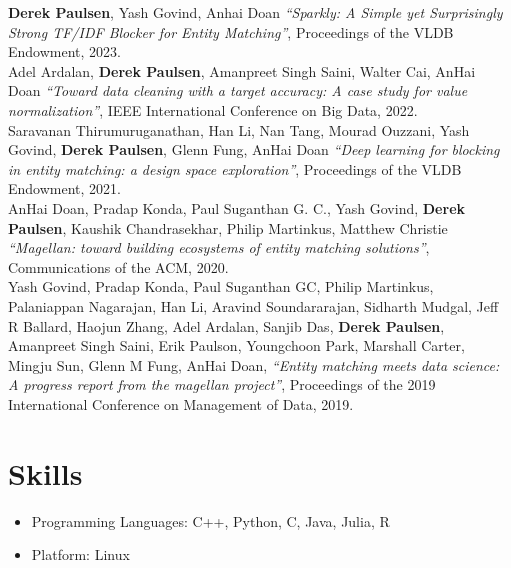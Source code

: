 \documentclass{resume}
\begin{document}
\textbf{Derek Paulsen}, Yash Govind, Anhai Doan
\textit{``Sparkly: A Simple yet Surprisingly Strong TF/IDF Blocker for Entity Matching''},
Proceedings of the VLDB Endowment, 2023.\\

Adel Ardalan, \textbf{Derek Paulsen}, Amanpreet Singh Saini, Walter Cai, AnHai Doan
\textit{``Toward data cleaning with a target accuracy: A case study for value normalization''},
IEEE International Conference on Big Data, 2022.\\

Saravanan Thirumuruganathan, Han Li, Nan Tang, Mourad Ouzzani, Yash Govind, \textbf{Derek Paulsen}, Glenn Fung, AnHai Doan
\textit{``Deep learning for blocking in entity matching: a design space exploration''},
Proceedings of the VLDB Endowment, 2021.\\

AnHai Doan, Pradap Konda, Paul Suganthan G. C., Yash Govind, \textbf{Derek Paulsen}, Kaushik Chandrasekhar, Philip Martinkus, Matthew Christie
\textit{``Magellan: toward building ecosystems of entity matching solutions''},
Communications of the ACM, 2020.\\

Yash Govind, Pradap Konda, Paul Suganthan GC, Philip Martinkus, Palaniappan Nagarajan, Han Li, Aravind Soundararajan, Sidharth Mudgal, Jeff R Ballard, Haojun Zhang, Adel Ardalan, Sanjib Das, \textbf{Derek Paulsen}, Amanpreet Singh Saini, Erik Paulson, Youngchoon Park, Marshall Carter, Mingju Sun, Glenn M Fung, AnHai Doan,
\textit{``Entity matching meets data science: A progress report from the magellan project''},
Proceedings of the 2019 International Conference on Management of Data, 2019.\\



\section{Skills}
\begin{itemize}[parsep=0.5ex]
  \item Programming Languages: C++, Python, C, Java, Julia, R
  \item Platform: Linux
\end{itemize}
\end{document}
